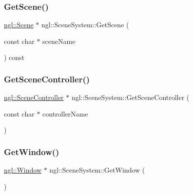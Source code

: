 \mbox{\label{classngl_1_1_scene_system_a6af397314087b88f0f46b6f9d09ffe87}} 
\subsubsection{\texorpdfstring{Get\+Scene()}{GetScene()}}
{\footnotesize\ttfamily \mbox{\hyperlink{classngl_1_1_scene}{ngl\+::\+Scene}} $\ast$ ngl\+::\+Scene\+System\+::\+Get\+Scene (\begin{DoxyParamCaption}\item[{const char $\ast$}]{scene\+Name }\end{DoxyParamCaption}) const}

\mbox{\label{classngl_1_1_scene_system_a92b4a89cd1afb9002cef4320a5a4d304}} 
\subsubsection{\texorpdfstring{Get\+Scene\+Controller()}{GetSceneController()}}
{\footnotesize\ttfamily \mbox{\hyperlink{classngl_1_1_scene_controller}{ngl\+::\+Scene\+Controller}} $\ast$ ngl\+::\+Scene\+System\+::\+Get\+Scene\+Controller (\begin{DoxyParamCaption}\item[{const char $\ast$}]{controller\+Name }\end{DoxyParamCaption})}

\mbox{\label{classngl_1_1_scene_system_a2af987ef6bc67cbc58f71e5b28acb141}} 
\subsubsection{\texorpdfstring{Get\+Window()}{GetWindow()}}
{\footnotesize\ttfamily \mbox{\hyperlink{classngl_1_1_window}{ngl\+::\+Window}} $\ast$ ngl\+::\+Scene\+System\+::\+Get\+Window (\begin{DoxyParamCaption}{ }\end{DoxyParamCaption})}

